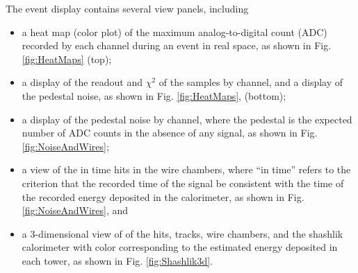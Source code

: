 The event display contains several view panels, including 
\begin{itemize}
\item a heat map (color plot) of the maximum analog-to-digital count (ADC) recorded by each channel during an event in real space, as shown in Fig. \ref{fig:HeatMaps} (top);
\item a display of the readout and $\chi^2$ of the samples by channel, and a display of the pedestal noise, as shown in Fig. \ref{fig:HeatMaps}, (bottom);
\item a display of the pedestal noise by channel, where the pedestal is the expected number of ADC counts in the absence of any signal, as shown in Fig. \ref{fig:NoiseAndWires};
\item a view of the in time hits in the wire chambers, where ``in time'' refers to the criterion that the recorded time of the signal be consistent with the time of the recorded energy deposited in the calorimeter, as shown in Fig. \ref{fig:NoiseAndWires}, and
\item a 3-dimensional view of of the hits, tracks, wire chambers, and the shashlik calorimeter with color corresponding to the estimated energy deposited in each tower, as shown in Fig. \ref{fig:Shashlik3d}.
\end{itemize}
